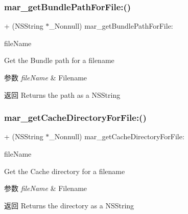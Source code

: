 \subsubsection{\texorpdfstring{mar\+\_\+get\+Bundle\+Path\+For\+File\+:()}{mar\_getBundlePathForFile:()}}
{\footnotesize\ttfamily + (N\+S\+String $\ast$\+\_\+\+Nonnull) mar\+\_\+get\+Bundle\+Path\+For\+File\+: \begin{DoxyParamCaption}\item[{(N\+S\+String $\ast$ \+\_\+\+Nonnull)}]{file\+Name }\end{DoxyParamCaption}}

Get the Bundle path for a filename


\begin{DoxyParams}{参数}
{\em file\+Name} & Filename\\
\hline
\end{DoxyParams}
\begin{DoxyReturn}{返回}
Returns the path as a N\+S\+String 
\end{DoxyReturn}
\mbox{\label{category_n_s_file_manager_07_m_a_r_e_x_08_a545531e1ab0fc9dfbd4e58c437ce6461}} 
\subsubsection{\texorpdfstring{mar\+\_\+get\+Cache\+Directory\+For\+File\+:()}{mar\_getCacheDirectoryForFile:()}}
{\footnotesize\ttfamily + (N\+S\+String $\ast$\+\_\+\+Nonnull) mar\+\_\+get\+Cache\+Directory\+For\+File\+: \begin{DoxyParamCaption}\item[{(N\+S\+String $\ast$ \+\_\+\+Nonnull)}]{file\+Name }\end{DoxyParamCaption}}

Get the Cache directory for a filename


\begin{DoxyParams}{参数}
{\em file\+Name} & Filename\\
\hline
\end{DoxyParams}
\begin{DoxyReturn}{返回}
Returns the directory as a N\+S\+String 
\end{DoxyReturn}
\mbox{\label{category_n_s_file_manager_07_m_a_r_e_x_08_a70753829a80f6a20831c9f90ca37d1a8}} 
